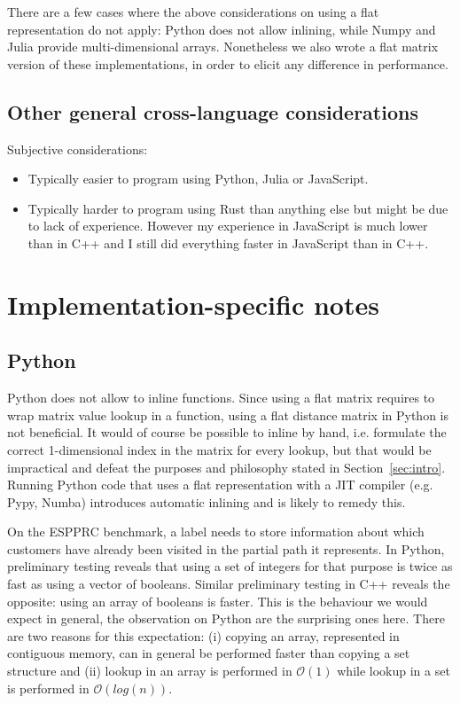 \documentclass[11pt,a4paper,notitlepage]{article}
\begin{document}
There are a few cases where the above considerations on using a flat
representation do not apply: Python does not allow inlining, while
Numpy and Julia provide multi-dimensional arrays. Nonetheless we also
wrote a flat matrix version of these implementations, in order
to elicit any difference in performance. 

\subsection{Other general cross-language considerations}
Subjective considerations:
\begin{itemize}
\item Typically easier to program using Python, Julia or JavaScript.
\item Typically harder to program using Rust than anything else but
  might be due to lack of experience. However my experience in
  JavaScript is much lower than in C++ and I still did everything
  faster in JavaScript than in C++.
\end{itemize}


\section{Implementation-specific notes}
\subsection{Python}
Python does not allow to inline functions. Since using a flat matrix
requires to wrap matrix value lookup in a function, using a flat distance
matrix in Python is not beneficial. It would of course be possible to
inline by hand, i.e. formulate the correct 1-dimensional index in the
matrix for every lookup, but that would be impractical and defeat the
purposes and philosophy stated in Section~\ref{sec:intro}.
Running Python code that uses a flat representation with a JIT compiler
(e.g. Pypy, Numba) introduces automatic inlining and is likely to
remedy this.

On the ESPPRC benchmark, a label needs to store information about
which customers have already been visited in the partial path it
represents. In Python, preliminary testing reveals that using a set of
integers for that purpose is twice as fast as using a vector of
booleans. Similar preliminary testing in C++ reveals the opposite:
using an array of booleans is faster. This is the behaviour we would
expect in general, the observation on Python are the surprising ones
here. There are two reasons for this expectation: (i) copying an array,
represented in contiguous memory, can in general be performed faster
than copying a set structure and (ii) lookup in an array is performed
in $\mathcal{O}(1)$ while lookup in a set is performed in
$\mathcal{O}(log(n))$.
\end{document}

